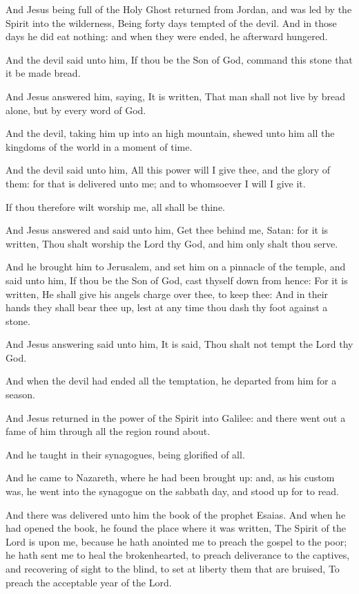 \Chapter
\Verse And Jesus being full of the Holy Ghost returned from Jordan, and was led by the Spirit into the wilderness, \Verse Being forty days tempted of the devil. And in those days he did eat nothing: and when they were ended, he afterward hungered.

\Verse And the devil said unto him, If thou be the Son of God, command this stone that it be made bread.

\Verse And Jesus answered him, saying, It is written, That man shall not live by bread alone, but by every word of God.

\Verse And the devil, taking him up into an high mountain, shewed unto him all the kingdoms of the world in a moment of time.

\Verse And the devil said unto him, All this power will I give thee, and the glory of them: for that is delivered unto me; and to whomsoever I will I give it.

\Verse If thou therefore wilt worship me, all shall be thine.

\Verse And Jesus answered and said unto him, Get thee behind me, Satan: for it is written, Thou shalt worship the Lord thy God, and him only shalt thou serve.

\Verse And he brought him to Jerusalem, and set him on a pinnacle of the temple, and said unto him, If thou be the Son of God, cast thyself down from hence: \Verse For it is written, He shall give his angels charge over thee, to keep thee: \Verse And in their hands they shall bear thee up, lest at any time thou dash thy foot against a stone.

\Verse And Jesus answering said unto him, It is said, Thou shalt not tempt the Lord thy God.

\Verse And when the devil had ended all the temptation, he departed from him for a season.

\Verse And Jesus returned in the power of the Spirit into Galilee: and there went out a fame of him through all the region round about.

\Verse And he taught in their synagogues, being glorified of all.

\Verse And he came to Nazareth, where he had been brought up: and, as his custom was, he went into the synagogue on the sabbath day, and stood up for to read.

\Verse And there was delivered unto him the book of the prophet Esaias.  And when he had opened the book, he found the place where it was written, \Verse The Spirit of the Lord is upon me, because he hath anointed me to preach the gospel to the poor; he hath sent me to heal the brokenhearted, to preach deliverance to the captives, and recovering of sight to the blind, to set at liberty them that are bruised, \Verse To preach the acceptable year of the Lord.

